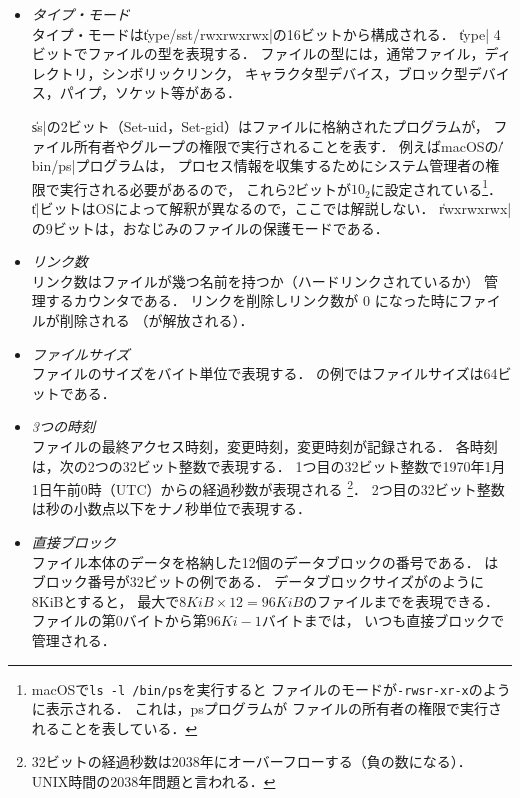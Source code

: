 \begin{itemize}
\item \emph{タイプ・モード}\\
  タイプ・モードは\|type/sst/rwxrwxrwx|の16ビットから構成される．
  \|type| 4ビットでファイルの型を表現する．
  ファイルの型には，通常ファイル，ディレクトリ，シンボリックリンク，
  キャラクタ型デバイス，ブロック型デバイス，パイプ，ソケット等がある．

  \|ss|の2ビット（Set-uid，Set-gid）はファイルに格納されたプログラムが，
  ファイル所有者やグループの権限で実行されることを表す．
  例えばmacOSの\|/bin/ps|プログラムは，
  プロセス情報を収集するためにシステム管理者の権限で実行される必要があるので，
  これら2ビットが$10_2$に設定されている\footnote{
    macOSで\texttt{ls -l /bin/ps}を実行すると
    ファイルのモードが\texttt{-rwsr-xr-x}のように表示される．
    これは，psプログラムが
    ファイルの所有者の権限で実行されることを表している．}．
  \|t|ビットはOSによって解釈が異なるので，ここでは解説しない．
  \|rwxrwxrwx|の9ビットは，おなじみのファイルの保護モードである．

\item \emph{リンク数}\\
  リンク数はファイルが幾つ名前を持つか（ハードリンクされているか）
  管理するカウンタである．
  リンクを削除しリンク数が 0 になった時にファイルが削除される
  （\inode が解放される）．

\item \emph{ファイルサイズ}\\
  ファイルのサイズをバイト単位で表現する．
  の例ではファイルサイズは64ビットである．

\item \emph{3つの時刻}\\
  ファイルの最終アクセス時刻，変更時刻，\inode 変更時刻が記録される．
  各時刻は，次の2つの32ビット整数で表現する．
  1つ目の32ビット整数で1970年1月1日午前0時（UTC）からの経過秒数が表現される
  \footnote{32ビットの経過秒数は2038年にオーバーフローする（負の数になる）．
    UNIX時間の2038年問題と言われる．}．
  2つ目の32ビット整数は秒の小数点以下をナノ秒単位で表現する．

\item \emph{直接ブロック}\\
  ファイル本体のデータを格納した12個のデータブロックの番号である．
  はブロック番号が32ビットの例である．
  データブロックサイズがのように8KiBとすると，
  最大で$8KiB \times 12 = 96KiB$のファイルまでを表現できる．
  ファイルの第$0$バイトから第$96Ki - 1$バイトまでは，
  いつも直接ブロックで管理される．


\end{itemize}
